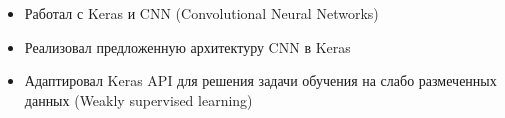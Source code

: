 \begin{itemize}
    \item Работал с Keras и CNN (Convolutional Neural Networks)
    \item Реализовал предложенную архитектуру CNN в Keras
    \item Адаптировал Keras API для решения задачи обучения на слабо размеченных данных (Weakly supervised learning)
\end{itemize}
